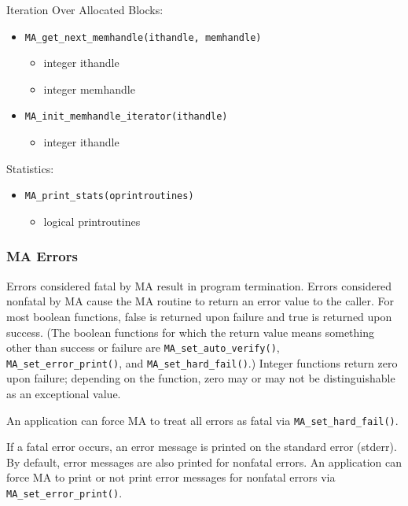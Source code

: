 Iteration Over Allocated Blocks:
\begin{itemize}
\item {\tt MA\_get\_next\_memhandle(ithandle, memhandle)}
\begin{itemize}
\item      integer ithandle
\item      integer memhandle
\end{itemize}

\item {\tt MA\_init\_memhandle\_iterator(ithandle)}
\begin{itemize}
\item      integer ithandle
\end{itemize}

\end{itemize}

Statistics:
\begin{itemize}
\item {\tt MA\_print\_stats(oprintroutines)}
\begin{itemize}
\item      logical printroutines
\end{itemize}

\end{itemize}


\subsubsection{MA Errors}

Errors considered fatal by MA result in program termination.  Errors
considered nonfatal by MA cause the MA routine to return an error
value to the caller.  For most boolean functions, false is returned
upon failure and true is returned upon success.  (The boolean
functions for which the return value means something other than
success or failure are {\tt MA\_set\_auto\_verify()}, {\tt
  MA\_set\_error\_print()}, and {\tt MA\_set\_hard\_fail()}.)  Integer
functions return zero upon failure; depending on the function, zero
may or may not be distinguishable as an exceptional value.

An application can force MA to treat all errors as fatal via
{\tt MA\_set\_hard\_fail()}.

If a fatal error occurs, an error message is printed on the standard
error (stderr).  By default, error messages are also printed for
nonfatal errors.  An application can force MA to print or not print
error messages for nonfatal errors via {\tt MA\_set\_error\_print()}.


